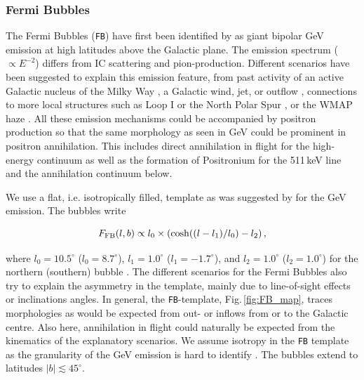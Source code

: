 \documentclass[doublespace,nopageskip]{VTthesis} %
\newcommand{\mrm}[1]{\mathrm{#1}}
\begin{document}
\subsubsection{Fermi Bubbles}

The Fermi Bubbles (\texttt{FB}) have first been identified by \citet{2010ApJ...724.1044S} as giant bipolar GeV emission at high latitudes above the Galactic plane.
%
The emission spectrum ($\propto E^{-2}$) differs from IC scattering and pion-production.
%
Different scenarios have been suggested to explain this emission feature, from past activity of an active Galactic nucleus of the Milky Way \citep{2010ApJ...724.1044S,2012MNRAS.424..666Z,2012ApJ...756..181G,2017ApJ...850....2Y}, a Galactic wind, jet, or outflow \citep{2012MNRAS.423.3512C,2015MNRAS.453.3827S,2014MNRAS.444L..39L}, connections to more local structures such as Loop I or the North Polar Spur \citep{2013ApJ...779...57K,2015MNRAS.447.3824S,2014ApJ...793...64A}, or the WMAP haze \citep{2012ApJ...750...17D,2014ApJ...793...64A,2015ApJ...808..107C}.
%
All these emission mechanisms could be accompanied by positron production so that the same morphology as seen in GeV could be prominent in positron annihilation.
%
This includes direct annihilation in flight for the high-energy continuum as well as the formation of Positronium for the 511\,keV line and the annihilation continuum below.

We use a flat, i.e. isotropically filled, template as was suggested by \citet{2018NatAs...2..387M} for the GeV emission.
%
The bubbles write

\begin{equation}
	F_{\rm FB}(l,b) \propto l_0 \times \left( \cosh((l-l_1)/l_0) - l_2 \right)\mrm{,}
	\label{eq:FB_formula}
\end{equation}

\noindent where $l_0 = 10.5^{\circ}$ ($l_0 = 8.7^{\circ}$), $l_1 = 1.0^{\circ}$ ($l_1 = -1.7^{\circ}$), and $l_2 = 1.0^{\circ}$ ($l_2 = 1.0^{\circ}$) for the northern (southern) bubble \citep{2016ApJS..223...26A}.
%
The different scenarios for the Fermi Bubbles also try to explain the asymmetry in the template, mainly due to line-of-sight effects or inclinations angles.
%
In general, the \texttt{FB}-template, Fig.\,\ref{fig:FB_map}, traces morphologies as would be expected from out- or inflows from or to the Galactic centre.
%
Also here, annihilation in flight could naturally be expected from the kinematics of the explanatory scenarios.
%
We assume isotropy in the \texttt{FB} template as the granularity of the GeV emission is hard to identify \citep{2014ApJ...793...64A}.
%
The bubbles extend to latitudes $|b| \lesssim 45^{\circ}$.
\end{document}
